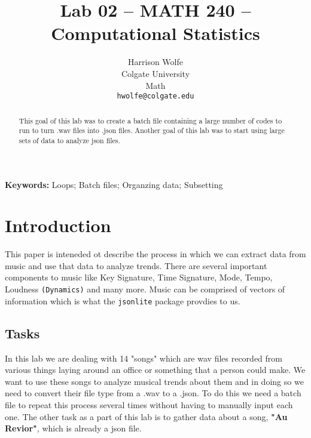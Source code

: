 \documentclass{article}\usepackage[]{graphicx}\usepackage[]{xcolor}
\begin{document}
\vspace{-1in}
\title{Lab 02 -- MATH 240 -- Computational Statistics}

\author{
  Harrison Wolfe \\
  Colgate University  \\
  Math  \\
  {\tt hwolfe@colgate.edu}
}

\date{}

\maketitle

\begin{multicols}{2}
\begin{abstract}

This goal of this lab was to create a batch file containing a large number of codes to run to turn .wav files into .json files. Another goal of this lab was to start using large sets of data to analyze json files. 
\end{abstract}

\noindent \textbf{Keywords:} Loops; Batch files; Organzing data; Subsetting

\section{Introduction}

This paper is inteneded ot describe the process in which we can extract data from music and use that data to analyze trends. There are several important components to music like Key Signature, Time Signature, Mode, Tempo, Loudness \verb|(Dynamics)| and many more. Music can be comprised of vectors of information which is what the \texttt{jsonlite} package provdies to us. 
\subsection{Tasks}
In this lab we are dealing with 14 "songs" which are wav files recorded from various things laying around an office or something that a person could make. We want to use these songs to analyze musical trends about them and in doing so we need to convert their file type from a .wav to a .json. To do this we need a batch file to repeat this process several times without having to manually input each one. The other task as a part of this lab is to gather data about a song, \textbf{"Au Revior"}, which is already a json file. 




\end{multicols}
\end{document}
